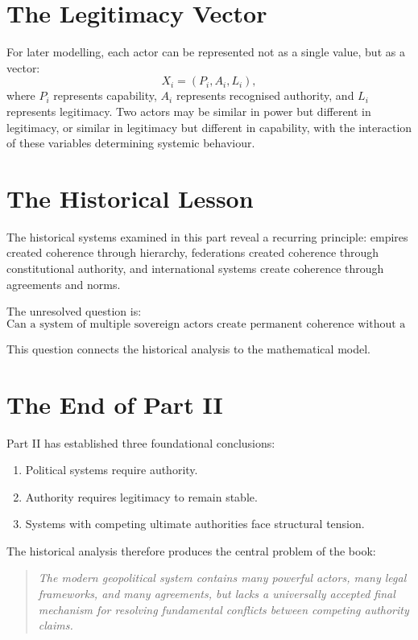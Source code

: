 \documentclass[11pt,openany]{book}
\theoremstyle{plain}
\theoremstyle{definition}
\begin{document}
\section*{The Legitimacy Vector}

For later modelling, each actor can be represented not as a single value, but as a vector:
\[
X_i = (P_i, A_i, L_i),
\]
where \(P_i\) represents capability, \(A_i\) represents recognised authority, and \(L_i\) represents legitimacy. Two actors may be similar in power but different in legitimacy, or similar in legitimacy but different in capability, with the interaction of these variables determining systemic behaviour.

\section*{The Historical Lesson}

The historical systems examined in this part reveal a recurring principle: empires created coherence through hierarchy, federations created coherence through constitutional authority, and international systems create coherence through agreements and norms. 

The unresolved question is:
\[
\boxed{
\text{Can a system of multiple sovereign actors create permanent coherence without a universally accepted source of final legitimacy?}
}
\]

This question connects the historical analysis to the mathematical model.

\section*{The End of Part II}

Part II has established three foundational conclusions:

\begin{enumerate}
    \item Political systems require authority.

    \item Authority requires legitimacy to remain stable.

    \item Systems with competing ultimate authorities face structural tension.
\end{enumerate}

The historical analysis therefore produces the central problem of the book:
\begin{quote}
\textit{The modern geopolitical system contains many powerful actors, many legal frameworks, and many agreements, but lacks a universally accepted final mechanism for resolving fundamental conflicts between competing authority claims.}
\end{quote}
\end{document}
